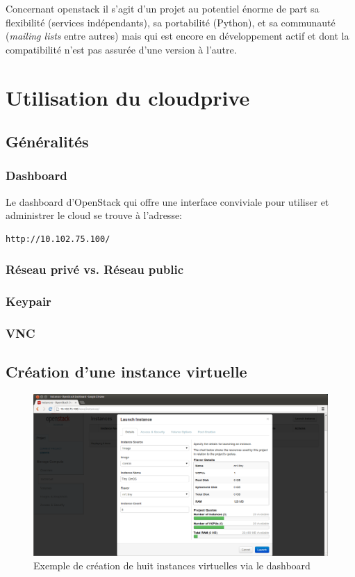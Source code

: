 \documentclass[a4paper,oneside]{report}
\begin{document}
Concernant \gls{openstack} il s'agit d'un projet au potentiel énorme de part sa flexibilité (services indépendants), sa portabilité (Python), et sa communauté (\emph{mailing lists} entre autres) mais qui est encore en développement actif et dont la compatibilité n'est pas assurée d'une version à l'autre.




\appendix
\chapter{Utilisation du \gls{cloudprive}}
\section{Généralités}
\subsection{Dashboard}
Le dashboard d'OpenStack qui offre une interface conviviale pour utiliser et administrer le cloud se trouve à l'adresse:
\begin{verbatim}
http://10.102.75.100/
\end{verbatim}

\subsection{Réseau privé vs. Réseau public}

\subsection{Keypair}

\subsection{VNC}


\section{Création d'une instance virtuelle}
\begin{figure}[!h]
\centering
\includegraphics[resolution=200]{images/dashboard_create_details.png}
\caption{Exemple de création de huit instances virtuelles via le dashboard}
\end{figure}
\end{document}
